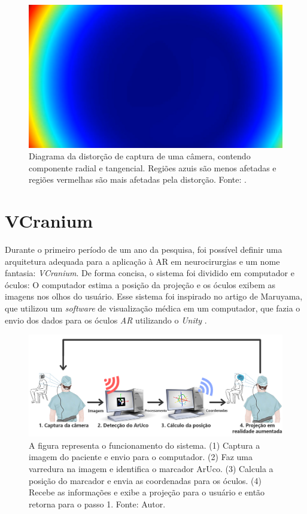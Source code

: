 \begin{figure}[H]
    \centering
    \includegraphics[width=.5\linewidth]{figuras/Distortion Color.png}
    \caption{Diagrama da distorção de captura de uma câmera, contendo componente radial e tangencial. Regiões azuis são menos afetadas e regiões vermelhas são mais afetadas pela distorção. Fonte: \cite{augmented-calib}.}
    \label{fig:distort-diagram}
\end{figure}

\section{VCranium}\label{chp:vcranium} 

Durante o primeiro período de um ano da pesquisa, foi possível definir uma arquitetura adequada para a aplicação à AR em neurocirurgias e um nome fantasia: \textit{VCranium}. De forma concisa, o sistema foi dividido em computador e óculos: O computador estima a posição da projeção e os óculos exibem as imagens nos olhos do usuário. Esse sistema foi inspirado no artigo de Maruyama, que utilizou um \textit{software} de visualização médica em um computador, que fazia o envio dos dados para os óculos \textit{AR} utilizando o \textit{Unity} \cite{Maruyama2018}.

\begin{figure}[ht]
    \centering
    \includegraphics[width=.9\linewidth]{figuras/System schematic.png}
    \caption{A figura representa o funcionamento do sistema. (1) Captura a imagem do paciente e envio para o computador. (2) Faz uma varredura na imagem e identifica o marcador ArUco. (3) Calcula a posição do marcador e envia as coordenadas para os óculos. (4) Recebe as informações e exibe a projeção para o usuário e então retorna para o passo 1. Fonte: Autor.}
    \label{fig:arc}
\end{figure}

